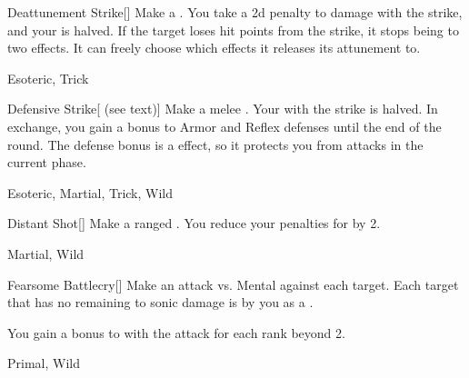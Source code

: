 \lowercase{\hypertarget{maneuver:Deattunement Strike}{}}\label{maneuver:Deattunement Strike}
\hypertarget{maneuver:Deattunement Strike}{}
\begin{freeability}[Rank 2]{Deattunement Strike}[]
Make a .
You take a \minus2d penalty to damage with the strike, and your  is halved.
If the target loses hit points from the strike, it stops being  to two effects.
It can freely choose which effects it releases its attunement to.


 Esoteric, Trick
\end{freeability}
\vspace{0.25em}



\lowercase{\hypertarget{maneuver:Defensive Strike}{}}\label{maneuver:Defensive Strike}
\hypertarget{maneuver:Defensive Strike}{}
\begin{freeability}[Rank 2]{Defensive Strike}[ (see text)]
Make a melee .
Your  with the strike is halved.
In exchange, you gain a  bonus to Armor and Reflex defenses until the end of the round.
The defense bonus is a  effect, so it protects you from attacks in the current phase.


 Esoteric, Martial, Trick, Wild
\end{freeability}
\vspace{0.25em}



\lowercase{\hypertarget{maneuver:Distant Shot}{}}\label{maneuver:Distant Shot}
\hypertarget{maneuver:Distant Shot}{}
\begin{freeability}[Rank 2]{Distant Shot}[]
Make a ranged .
You reduce your penalties for  by 2.


 Martial, Wild
\end{freeability}
\vspace{0.25em}



\lowercase{\hypertarget{maneuver:Fearsome Battlecry}{}}\label{maneuver:Fearsome Battlecry}
\hypertarget{maneuver:Fearsome Battlecry}{}
\begin{freeability}[Rank 2]{Fearsome Battlecry}[]
Make an attack vs. Mental against each target.
\hit Each target that has no remaining  to sonic damage is  by you as a .

\rankline
You gain a  bonus to  with the attack for each rank beyond 2.


 Primal, Wild
\end{freeability}
\vspace{0.25em}



